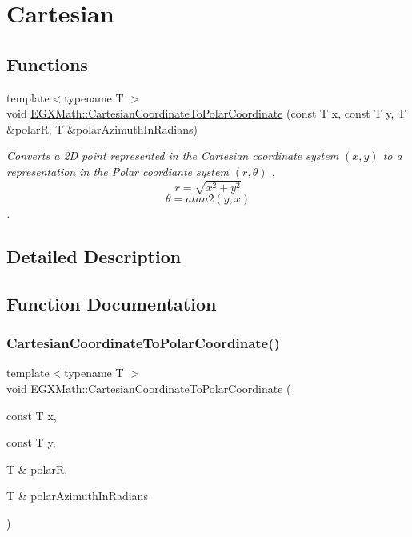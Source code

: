 \hypertarget{group___e_g_x_math-_conversions-_coordinate_conversions-2_d-_cartesian}{}\section{Cartesian}
\label{group___e_g_x_math-_conversions-_coordinate_conversions-2_d-_cartesian}
\subsection*{Functions}
\begin{DoxyCompactItemize}
\item 
{\footnotesize template$<$typename T $>$ }\\void \mbox{\hyperlink{group___e_g_x_math-_conversions-_coordinate_conversions-2_d-_cartesian_ga606ec2b97e0000d9b2a511c0e7b74bc9}{E\+G\+X\+Math\+::\+Cartesian\+Coordinate\+To\+Polar\+Coordinate}} (const T x, const T y, T \&polarR, T \&polar\+Azimuth\+In\+Radians)
\begin{DoxyCompactList}\small\item\em Converts a 2D point represented in the Cartesian coordinate system $(x,y)$ to a representation in the Polar coordiante system $(r,\theta)$ . \[ r = \sqrt{x^2+y^2} \] \[ \theta = atan2(y,x) \]. \end{DoxyCompactList}\end{DoxyCompactItemize}


\subsection{Detailed Description}


\subsection{Function Documentation}
\mbox{\label{group___e_g_x_math-_conversions-_coordinate_conversions-2_d-_cartesian_ga606ec2b97e0000d9b2a511c0e7b74bc9}} 
\subsubsection{\texorpdfstring{Cartesian\+Coordinate\+To\+Polar\+Coordinate()}{CartesianCoordinateToPolarCoordinate()}}
{\footnotesize\ttfamily template$<$typename T $>$ \\
void E\+G\+X\+Math\+::\+Cartesian\+Coordinate\+To\+Polar\+Coordinate (\begin{DoxyParamCaption}\item[{const T}]{x,  }\item[{const T}]{y,  }\item[{T \&}]{polarR,  }\item[{T \&}]{polar\+Azimuth\+In\+Radians }\end{DoxyParamCaption})}



